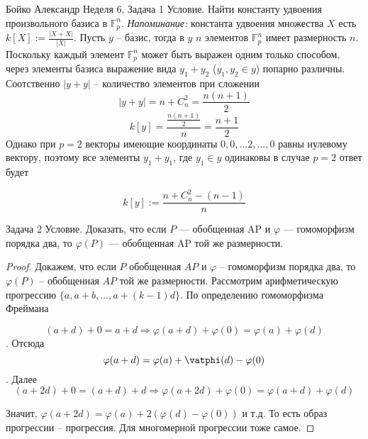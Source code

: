 \documentclass[a4paper,12pt]{article}
\numberwithin{equation}{section}
\theoremstyle{plain}
\theoremstyle{definition}
\theoremstyle{remark}
\def\F{\mathbb {F}}
\begin{document}

Бойко Александр
\newline
\newline
Неделя 6, Задача 1 \newline
Условие. Найти константу удвоения произвольного базиса в $\F_p^n$. \textit{Напоминание:}  константа удвоения множества $X$ есть $k[X] := \frac{|X + X|}{|X|}$. \newline
Пусть $y$ -- базис, тогда в $y$ $n$ элементов $\F_p^n$ имеет размерность $n$. \newline
Поскольку каждый элемент $\F_p^n$ может быть выражен одним только способом, через элементы базиса \Rightarrow выражение вида $y_1 + y_2$ ($y_1, y_2 \in y$) попарно различны. Соотственно $|y+y|$ -- количество элементов при сложении $$|y+y| = n + C_n^2 = \frac{n(n+1)}{2}$$
$$k[y] = \frac{\frac{n(n+1)}{2}}{n} = \frac{n+1}{2}$$
Однако при $p=2$ векторы имеющие координаты $0,0, \ldots 2, \ldots, 0$ равны нулевому вектору, поэтому все элементы $y_1+y_1$, где $y_1 \in y$ одинаковы \Rightarrow в случае $p=2$ ответ будет 

$$k[y] := \frac{n+C_n^2 - (n-1)}{n}$$ \newline
\newline

Задача 2 \newline
Условие. Доказать, что если $P$ --- обобщенная AP и $\varphi$ --- гомоморфизм порядка два, то $\varphi (P)$ --- обобщенная AP той же размерности.
\begin{proof}
Докажем, что если $P$ обобщенная $AP$ и $\varphi$ -- гомоморфизм порядка два, то $\varphi(P)$ -- обобщенная $AP$ той же размерности. \newline
Рассмотрим арифметическую прогрессию $\{a, a+b, \ldots, a + (k-1)d\}$. По определению гомоморфизма Фреймана

$$(a+d) + 0 = a + d \Rightarrow \varphi(a+d) + \varphi(0) = \varphi(a) + \varphi(d)$$.
Отсюда 
$$\varphi(a+d)=\varphi(a) + \vatphi(d) - \varphi(0)$$.
Далее
$$(a+2d) + 0 = (a+d)+d \Rightarrow \varphi(a+2d) + \varphi(0) = \varphi(a+d) + \varphi(d)$$

Значит, $\varphi(a+2d) = \varphi(a) + 2(\varphi(d) - \varphi(0))$ и т.д. То есть образ прогрессии -- прогрессия. Для многомерной прогрессии тоже самое.

\end{proof}
\end{document}
